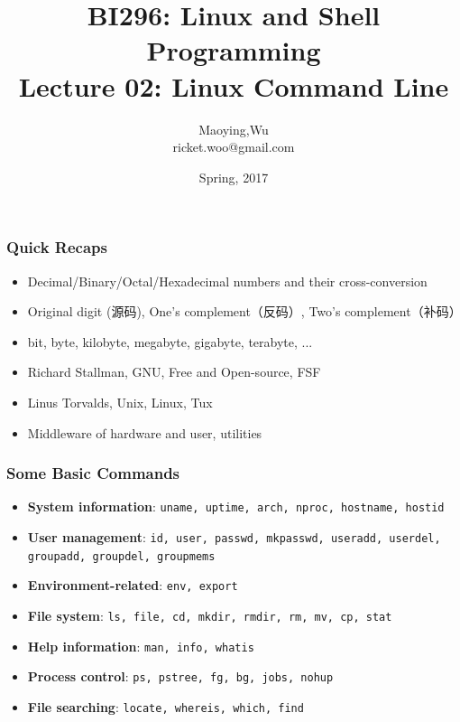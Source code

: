 \documentclass[red]{beamer}
\title[BI296-Lec02]{\tiny{BI296: Linux and Shell Programming}\\
\Large{Lecture 02: Linux Command Line}}
\author[Maoying Wu]{Maoying,Wu\\
{\scriptsize ricket.woo@gmail.com}}
\institute[CBB] %
{
  \inst{}
  Dept. of Bioinformatics \& Biostatistics\\
  Shanghai Jiao Tong University
}
\date{Spring, 2017}
\begin{document}
\begin{CJK*}{UTF8}{gbsn}
\frame{\titlepage}

\begin{frame}
\frametitle{Quick Recaps}
\begin{itemize}
	\item Decimal/Binary/Octal/Hexadecimal numbers and their cross-conversion
	\item Original digit (源码), One's complement（反码）, Two's complement（补码）
	\item bit, byte, kilobyte, megabyte, gigabyte, terabyte, ...
	\item Richard Stallman, GNU, Free and Open-source, FSF
	\item Linus Torvalds, Unix, Linux, Tux
	\item Middleware of hardware and user, utilities 
\end{itemize}
\end{frame}


\begin{frame}[containsverbatim]
\frametitle{Some Basic Commands}
\begin{itemize}
	\item \textbf{System information}: {\lstinline{uname, uptime, arch, nproc, hostname, hostid}}
	\item \textbf{User management}: {\lstinline{id, user, passwd, mkpasswd, useradd, userdel, groupadd, groupdel, groupmems}}
	\item \textbf{Environment-related}: {\lstinline{env, export}}
	\item \textbf{File system}: {\lstinline{ls, file, cd, mkdir, rmdir, rm, mv, cp, stat}}
	\item \textbf{Help information}: {\lstinline{man, info, whatis}}
	\item \textbf{Process control}: {\lstinline{ps, pstree, fg, bg, jobs, nohup}}
	\item \textbf{File searching}: {\lstinline{locate, whereis, which, find}}
\end{itemize}
\end{frame}



\end{CJK*}
\end{document}
